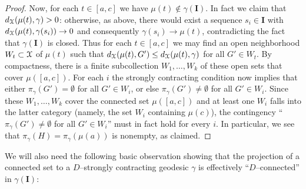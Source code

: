 \documentclass[letterpaper,fleqn]{article}
\theoremstyle{plain}
\theoremstyle{definition}
\newcommand{\os}{{\EuScript X}} %
\newcommand{\cp}{\pi} %
\newcommand{\I}{\mathbf{I}}
\begin{document}
\begin{proof}
Now, for each $t\in [a,c]$ we have $\mu(t)\notin\gamma(\I)$. In fact we claim that $d_\os(\mu(t),\gamma) > 0$: otherwise, as above, there would exist a sequence $s_i\in \I$ with $d_\os(\mu(t),\gamma(s_i)) \to 0$ and consequently $\gamma(s_i)\to \mu(t)$, contradicting the fact that $\gamma(\I)$ is closed. Thus for each $t\in [a,c]$ we may find an open neighborhood $W_t\subset \os$ of $\mu(t)$ such that $d_\os(\mu(t),G')\le d_\os(\mu(t),\gamma)$ for all $G'\in W_t$. 
By compactness, there is a finite subcollection $W_1,\dotsc,W_k$ of these open sets that cover $\mu([a,c])$. 
For each $i$ the strongly contracting condition now implies that  either $\cp_\gamma(G')= \emptyset$ for all $G'\in W_i$, or else $\cp_\gamma(G')\ne \emptyset$ for all $G'\in W_i$. Since these $W_1,\dotsc,W_k$ cover the connected set $\mu([a,c])$ and at least one $W_i$ falls into the latter category (namely, the set $W_i$ containing $\mu(c)$), the contingency ``$\cp_\gamma(G')\ne\emptyset$ for all $G'\in W_i$'' must in fact hold for every $i$. In particular, we see that $\cp_\gamma(H) = \cp_\gamma(\mu(a))$ is nonempty, as claimed.
\end{proof}

We will also need the following basic observation showing that the projection of a connected set to a $D$--strongly contracting geodesic $\gamma$ is effectively ``$D$--connected'' in $\gamma(\I)$:
\end{document}
